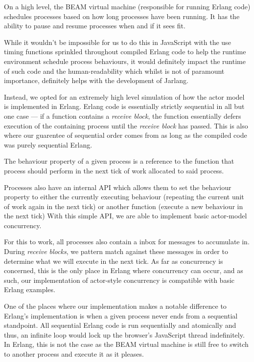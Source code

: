 \documentclass[twoside,12pt,titlepage,a4paper]{article}
\begin{document}
On a high level, the BEAM virtual machine (responsible for running Erlang code) schedules processes based on how long processes have been running. It has the ability to pause and resume processes when and if it sees fit. 

While it wouldn't be impossible for us to do this in JavaScript with the use timing functions sprinkled throughout compiled Erlang code to help the runtime environment schedule process behaviours, it would definitely impact the runtime of such code and the human-readability which whilst is not of paramount importance, definitely helps with the development of Jarlang.

Instead, we opted for an extremely high level simulation of how the actor model is implemented in Erlang. Erlang code is essentially strictly sequential in all but one case --- if a function contains a \textit{receive block}, the function essentially defers execution of the containing process until the \textit{receive block} has passed. This is also where our guarentee of sequential order comes from as long as the compiled code was purely sequential Erlang.

The behaviour property of a given process is a reference to the function that process should perform in the next tick of work allocated to said process. 

Processes also have an internal API which allows them to set the behaviour property to either the currently executing behaviour (repeating the current unit of work again in the next tick) or another function (execute a new behaviour in the next tick) With this simple API, we are able to implement basic actor-model concurrency.

For this to work, all processes also contain a inbox for messages to accumulate in. During \textit{receive blocks}, we pattern match against these messages in order to determine what we will execute in the next tick. As far as concurrency is concerned, this is the only place in Erlang where concurrency can occur, and as such, our implementation of actor-style concurrency is compatible with basic Erlang examples.

One of the places where our implementation makes a notable difference to Erlang's implementation is when a given process never ends from a sequential standpoint. All sequential Erlang code is run sequentially and atomically and thus, an infinite loop would lock up the browser's JavaScript thread indefinitely. In Erlang, this is not the case as the BEAM virtual machine is still free to switch to another process and execute it as it pleases.
\end{document}
